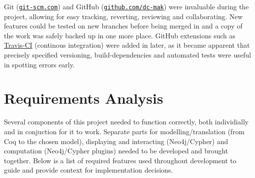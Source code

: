 Git (\href{http://git-scm.com}{\texttt{git-scm.com}}) and GitHub
(\href{http://github.com/dc-mak}{\texttt{github.com/dc-mak}}) were invaluable
during the project, allowing for easy tracking, reverting, reviewing and
collaborating.  New features could be tested on new branches before being
merged in and a copy of the work was safely backed up in one more place. GitHub
extensions such as \href{https://travis-ci.org}{Travis-CI} (continous
integration) were added in later, as it became apparent that precisely
specified versioning, build-dependencies and automated tests were useful in
spotting errors early.

\section{Requirements Analysis}
Several components of this project needed to function correctly, both
individially and in conjuction for it to work. Separate parts for
modelling/translation (from Coq to the chosen model), displaying and
interacting (Neo4j/Cypher) and computation (Neo4j/Cypher plugins)
needed to be developed and brought together. Below is a list of required
features used throughout development to guide and provide context for
implementation decisions.

